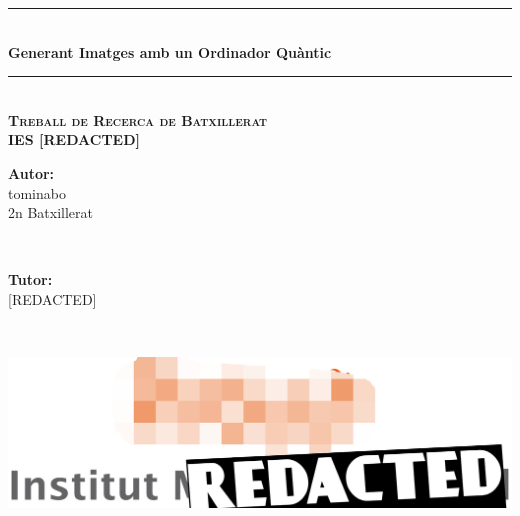 \documentclass[a4paper,12pt,arial,numbered,print,oneside]{book}
\newcommand{\HRule}{\rule{\linewidth}{0.5mm}}
\begin{document}
	\begin{titlepage}
		
		\begin{center}
		\begin{singlespace}%

		
		\HRule \\[0.4cm]
		{ \Huge \bfseries Generant Imatges amb un Ordinador Quàntic}\\[0.1cm] 
		\HRule \\[1.2cm]
		
		\textsc{\Large \textbf{Treball de Recerca de Batxillerat}}\\[.5cm]
		
		\textsc{\large \textbf{IES [REDACTED]}}\\[2cm]
		
		\vspace{8.5cm}
		\begin{minipage}{0.48\textwidth}
			\begin{flushleft} \large
				\Large \textbf{Autor:}\\
				\Large tominabo \\ 2n Batxillerat \\ 
			\end{flushleft}
		\end{minipage}
		~
		\begin{minipage}{0.48\textwidth}
			\begin{flushright} \large
				\Large \textbf{Tutor:} \\
				\Large [REDACTED]
			\end{flushright}
		\end{minipage}\\
		
		\vspace{1.5cm}
		\begin{minipage}{0.85\textwidth}
			\begin{center}
								\includegraphics[scale=0.2]{Figures/Cover/logo-REDACTED.png}
			\end{center}
		\end{minipage}
		

\end{singlespace}
\end{center}
\end{titlepage}
\end{document}
